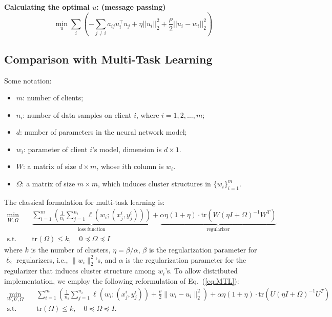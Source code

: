 {\textbf{Calculating the optimal $u$: (message passing)}
\begin{equation}
    \min_{u} \sum_{i} (- \sum_{j \neq i} a_{ij}u_{i}^{\top}u_{j} + \eta ||u_{i}||_{2}^{2} + \frac{\rho}{2} ||u_i - w_i||_{2}^{2})
\end{equation}

\subsection{Comparison with Multi-Task Learning}
Some notation:
\begin{itemize}
    \item $m$: number of clients;
    \item $n_i$: number of data samples on client $i$, where $i=1,2,\dots,m$;
    \item $d$: number of parameters in the neural network model;
    \item $w_i$: parameter of client $i$'s model, dimension is $d\times 1$.
    \item $W$: a matrix of size $d\times m$, whose $i$th column is $w_i$.
    \item $\Omega$: a matrix of size $m\times m$, which induces cluster structures in $\{w_i\}_{i=1}^m$.
\end{itemize}
The classical formulation for multi-task learning is:
\begin{equation}
    \label{eq:MTL}
    \begin{aligned}
    \min_{W,\Omega} & \quad \underbrace{\sum_{i=1}^m\left(\frac{1}{n_i}\sum_{j=1}^{n_i} \ell(w_i;(x_j^i,y_j^i))\right)}_{\mbox{loss function}} + \underbrace{\alpha\eta(1+\eta)\cdot\mbox{tr}(W(\eta I + \Omega)^{-1}W^T)}_{\mbox{regularizer}} \\
    \mbox{s.t.} & \quad \mbox{tr}(\Omega) \leq k, \quad 0\preceq\Omega\preceq I
    \end{aligned}
\end{equation}
where $k$ is the number of clusters, $\eta = \beta/\alpha$,  $\beta$ is the regularization parameter for $\ell_2$ regularizers, i.e., $\|w_i\|_2^2$'s, and $\alpha$ is the regularization parameter for the regularizer that induces cluster structure among $w_i$'s. To allow distributed implementation, we employ the following reformulation of Eq.~(\ref{eq:MTL}):
\begin{equation}
    \label{eq:MTL-dist}
    \begin{aligned}
    \min_{W,U,\Omega} & \quad \sum_{i=1}^m\left(\frac{1}{n_i}\sum_{j=1}^{n_i} \ell(w_i;(x_j^i,y_j^i)) + \frac{\rho}{2}\|w_i - u_i\|_2^2\right) + \alpha\eta(1+\eta)\cdot\mbox{tr}(U(\eta I + \Omega)^{-1}U^T) \\
    \mbox{s.t.} & \quad \mbox{tr}(\Omega) \leq k, \quad 0\preceq\Omega\preceq I.
    \end{aligned}
\end{equation}

}
